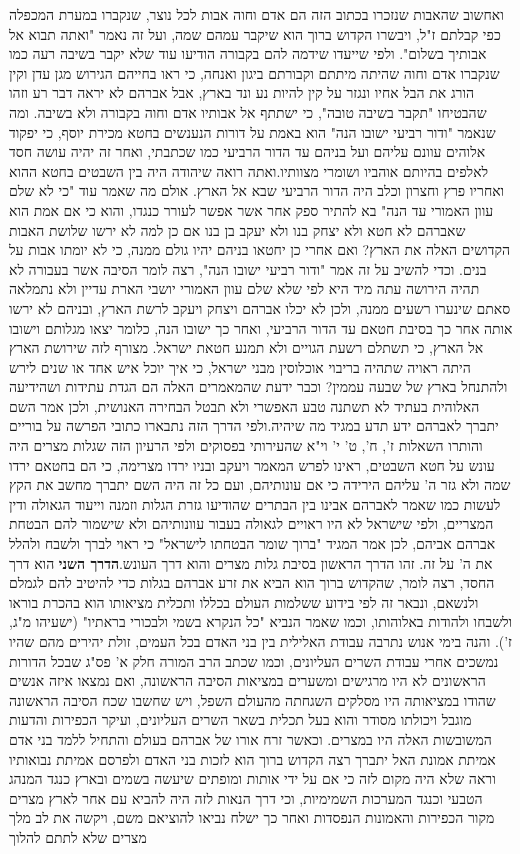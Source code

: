 \documentclass[12pt, openany]{book}
\begin{document}
ואחשוב שהאבות שנזכרו בכתוב הזה הם אדם וחוה אבות לכל נוצר, שנקברו במערת המכפלה כפי קבלתם ז"ל, ויבשרו הקדוש ברוך הוא שיקבר עמהם שמה, ועל זה נאמר "ואתה תבוא אל אבותיך בשלום". ולפי שייעדו שידמה להם בקבורה הודיעו עוד שלא יקבר בשיבה רעה כמו שנקברו אדם וחוה שהיתה מיתתם וקבורתם ביגון ואנחה, כי ראו בחייהם הגירוש מגן עדן וקין הורג את הבל אחיו ונגזר על קין להיות נע ונד בארץ, אבל אברהם לא יראה דבר רע וזהו שהבטיחו "תקבר בשיבה טובה", כי ישתתף אל אבותיו אדם וחוה בקבורה ולא בשיבה. ומה שנאמר "ודור רביעי ישובו הנה" הוא באמת על דורות הנענשים בחטא מכירת יוסף, כי יפקוד אלוהים עוונם עליהם ועל בניהם עד הדור הרביעי כמו שכתבתי, ואחר זה יהיה עושה חסד לאלפים בהיותם אוהביו ושומרי מצוותיו.ואתה רואה שיהודה היה בין השבטים בחטא ההוא ואחריו פרץ וחצרון וכלב היה הדור הרביעי שבא אל הארץ. אולם מה שאמר עוד "כי לא שלם עוון האמורי עד הנה" בא להתיר ספק אחר אשר אפשר לעורר כנגדו, והוא כי אם אמת הוא שאברהם לא חטא ולא יצחק בנו ולא יעקב בן בנו אם כן למה לא ירשו שלושת האבות הקדושים האלה את הארץ? ואם אחרי כן יחטאו בניהם יהיו גולם ממנה, כי לא יומתו אבות על בנים. וכדי להשיב על זה אמר "ודור רביעי ישובו הנה", רצה לומר הסיבה אשר בעבורה לא תהיה הירושה עתה מיד היא לפי שלא שלם עוון האמורי יושבי הארת עדיין ולא נתמלאה סאתם שינערו רשעים ממנה, ולכן לא יכלו אברהם ויצחק ויעקב לרשת הארץ, ובניהם לא ירשו אותה אחר כך בסיבת חטאם עד הדור הרביעי, ואחר כך ישובו הנה, כלומר יצאו מגלותם וישובו אל הארץ, כי תשתלם רשעת הגויים ולא תמנע חטאת ישראל. מצורף לזה שירושת הארץ היתה ראויה שתהיה בריבוי אוכלוסין מבני ישראל, כי איך יוכל איש אחד או שנים לירש ולהתנחל בארץ של שבעה עממין? וכבר ידעת שהמאמרים האלה הם הגדת עתידות ושהידיעה האלוהית בעתיד לא תשתנה טבע האפשרי ולא תבטל הבחירה האנושית, ולכן אמר השם יתברך לאברהם ידע תדע במגיד מה שיהיה.ולפי הדרך הזה נתבארו כתובי הפרשה על בוריים והותרו השאלות ז', ח', ט' י' וי"א שהעירותי בפסוקים ולפי הרעיון הזה שגלות מצרים היה עונש על חטא השבטים, ראינו לפרש המאמר ויעקב ובניו ירדו מצרימה, כי הם בחטאם ירדו שמה ולא גזר ה' עליהם הירידה כי אם עונותיהם, ועם כל זה היה השם יתברך מחשב את הקץ לעשות כמו שאמר לאברהם אבינו בין הבתרים שהודיעו גזרת הגלות וזמנה וייעוד הגאולה ודין המצריים, ולפי שישראל לא היו ראויים לגאולה בעבור עוונותיהם ולא שישמור להם הבטחת אברהם אביהם, לכן אמר המגיד "ברוך שומר הבטחתו לישראל" כי ראוי לברך ולשבח ולהלל את ה' על זה. זהו הדרך הראשון בסיבת גלות מצרים והוא דרך העונש.\textrm{\textbf{הדרך השני}} הוא דרך החסד, רצה לומר, שהקדוש ברוך הוא הביא את זרע אברהם בגלות כדי להיטיב להם לגמלם ולנשאם, ונבאר זה לפי בידוע ששלמות העולם בכללו ותכלית מציאותו הוא בהכרת בוראו ולשבחו ולהודות באלוהותו, וכמו שאמר הנביא "כל הנקרא בשמי ולבכורי בראתיו" (ישעיהו מ"ג, ז'). והנה בימי אנוש נתרבה עבודת האלילית בין בני האדם בכל העמים, זולת יהירים מהם שהיו נמשכים אחרי עבודת השרים העליונים, וכמו שכתב הרב המורה חלק א' פס"ג שבכל הדורות הראשונים לא היו מרגישים ומשערים במציאות הסיבה הראשונה, ואם נמצאו איזה אנשים שהודו במציאותה היו מסלקים השגחתה מהעולם השפל, ויש שחשבו שכח הסיבה הראשונה מוגבל ויכולתו מסודר והוא בעל תכלית בשאר השרים העליונים, ועיקר הכפירות והדעות המשובשות האלה היו במצרים. וכאשר זרח אורו של אברהם בעולם והתחיל ללמד בני אדם אמיתת אמונת האל יתברך רצה הקדוש ברוך הוא לזכות בני האדם ולפרסם אמיתת נבואותיו וראה שלא היה מקום לזה כי אם על ידי אותות ומופתים שיעשה בשמים ובארץ כנגד המנהג הטבעי וכנגד המערכות השמימיות, וכי דרך הנאות לזה היה להביא עם אחר לארץ מצרים מקור הכפירות והאמונות הנפסדות ואחר כך ישלח נביאו להוציאם משם, ויקשה את לב מלך מצרים שלא לתתם להלוך 
\end{document}
